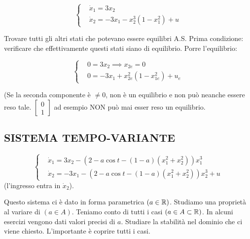 \begin{itemize}
\[	
	\left\{
	\begin{aligned}
	&\dot{x}_1 = 3x_2\\
	&\dot{x}_2 = -3x_1 -x_2^3(1-x_1^2)+u
	\end{aligned}
	\right.
\]

Trovare tutti gli altri stati che potevano essere equilibri A.S.
Prima condizione: verificare che effettivamente questi stati siano di equilibrio. Porre l'equilibrio:

\[
	\left\{
	\begin{aligned}
	&0 = 3x_2 \implies x_{2e} = 0\\
	&0 = -3x_1 + x_{2e}^2(1- x_{1e}^2) + u_e
	\end{aligned}
	\right.
\]

(Se la seconda componente è $\neq 0$, non è un equilibrio e non può neanche essere reso tale.
$\begin{bmatrix}0\\1\end{bmatrix}$ ad esempio NON può mai esser reso un equilibrio.

\end{itemize}

\subsection{SISTEMA TEMPO-VARIANTE}

\[
	\left\{
	\begin{aligned}
	&\dot{x}_1 = 3x_2 - (2-a\cos{t} - (1-a)(x_1^2+x_2^2))x_1^3\\
	&\dot{x}_2 = -3x_1 - (2-a\cos{t} - (1-a)(x_1^2+x_2^2))x_2^3 + u
	\end{aligned}
	\right.
\]
(l'ingresso entra in $\dot{x}_2$). 

Questo sistema ci è dato in forma parametrica $(a\in\mathbb{R})$. Studiamo una proprietà al variare di $(a\in A)$. Teniamo conto di tutti i casi $(a\in A\subset\mathbb{R})$. In alcuni esercizi vengono dati valori precisi di $a$. Studiare la stabilità nel dominio che ci viene chiesto. L'importante è coprire tutti i casi.

